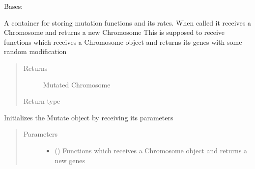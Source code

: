 \documentclass[letterpaper,10pt,english]{sphinxmanual}
\begin{document}

\begin{fulllineitems}
\label{\detokenize{genetic:genetic.Mutate}}
\sphinxAtStartPar
Bases: 

\sphinxAtStartPar
A container for storing mutation functions and its rates. When called it receives a Chromosome and returns
a new Chromosome
This is supposed to receive functions which receives a Chromosome object and returns its genes with some random
modification
\begin{quote}\begin{description}
\item[{Returns}] \leavevmode
\sphinxAtStartPar
Mutated Chromosome

\item[{Return type}] \leavevmode
\sphinxAtStartPar
{\hyperref[\detokenize{genetic:genetic.Chromosome}]{}}

\end{description}\end{quote}

\sphinxAtStartPar
Initializes the Mutate object by receiving its parameters
\begin{quote}\begin{description}
\item[{Parameters}] \leavevmode\begin{itemize}
\item {} 
\sphinxAtStartPar
{} (\sphinxstyleliteralemphasis{\sphinxupquote{{[}}}\sphinxstyleliteralemphasis{\sphinxupquote{{[}}}\sphinxstyleliteralemphasis{\sphinxupquote{{[}}}{\hyperref[\detokenize{genetic:genetic.Chromosome}]{\sphinxcrossref{\sphinxstyleliteralemphasis{\sphinxupquote{Chromosome}}}}}\sphinxstyleliteralemphasis{\sphinxupquote{{]}}}\sphinxstyleliteralemphasis{\sphinxupquote{, }}\sphinxstyleliteralemphasis{\sphinxupquote{{]}}}\sphinxstyleliteralemphasis{\sphinxupquote{{]}}}) \textendash{} Functions which receives a Chromosome object and returns a new genes


\end{itemize}
\end{description}
\end{quote}
\end{fulllineitems}
\end{document}
